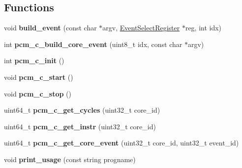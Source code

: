 \subsection*{Functions}
\begin{DoxyCompactItemize}
\item 
\mbox{\label{pcm-core_8cpp_ac493787fd6910618e564b9af590d4a7e}} 
void {\bfseries build\+\_\+event} (const char $\ast$argv, \mbox{\hyperlink{struct_event_select_register}{Event\+Select\+Register}} $\ast$reg, int idx)
\item 
\mbox{\label{pcm-core_8cpp_adce02f8513e11c6d4de1f7ba60d30d8a}} 
int {\bfseries pcm\+\_\+c\+\_\+build\+\_\+core\+\_\+event} (uint8\+\_\+t idx, const char $\ast$argv)
\item 
\mbox{\label{pcm-core_8cpp_af8a09843e89fa361b18ee1b60b473498}} 
int {\bfseries pcm\+\_\+c\+\_\+init} ()
\item 
\mbox{\label{pcm-core_8cpp_a2122b419fa049eb159d6884f644b8fdd}} 
void {\bfseries pcm\+\_\+c\+\_\+start} ()
\item 
\mbox{\label{pcm-core_8cpp_aa0f9769e2a0432139f64c892414dfd73}} 
void {\bfseries pcm\+\_\+c\+\_\+stop} ()
\item 
\mbox{\label{pcm-core_8cpp_ad36e4ae6268a5e2f985cd4d77dc1c5ca}} 
uint64\+\_\+t {\bfseries pcm\+\_\+c\+\_\+get\+\_\+cycles} (uint32\+\_\+t core\+\_\+id)
\item 
\mbox{\label{pcm-core_8cpp_a03babfb4f4942fe63bdb2a8f531c19e1}} 
uint64\+\_\+t {\bfseries pcm\+\_\+c\+\_\+get\+\_\+instr} (uint32\+\_\+t core\+\_\+id)
\item 
\mbox{\label{pcm-core_8cpp_a4563dc923dd15f4217aec1393212dbee}} 
uint64\+\_\+t {\bfseries pcm\+\_\+c\+\_\+get\+\_\+core\+\_\+event} (uint32\+\_\+t core\+\_\+id, uint32\+\_\+t event\+\_\+id)
\item 
\mbox{\label{pcm-core_8cpp_a4e43544978d9afb2faf08dce11cab70c}} 
void {\bfseries print\+\_\+usage} (const string progname)
\item 
\mbox{\label{pcm-core_8cpp_a857456f644c2e58f064fa2f70accc4dd}} 

\end{DoxyCompactItemize}
